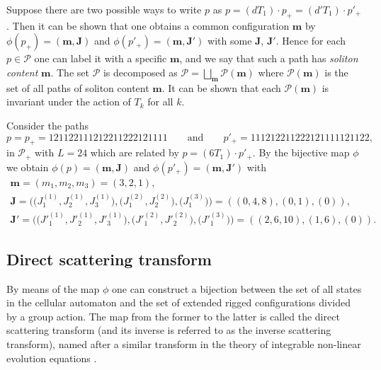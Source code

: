 \documentclass[pdftex]{sigma}
\newcommand{\Pth}{{\mathcal P}}
\newcommand{\m}{{\boldsymbol m}}
\newcommand{\boJ}{{\boldsymbol J}}
\begin{document}
Suppose there are two possible ways to write $p$ as $p =(d T_1) \cdot p_+ = (d' T_1) \cdot p'_+$.
Then it can be shown that
one obtains a common conf\/iguration $\m$ by $\phi (p_+) = (\m,\boJ)$ and $\phi (p'_+) = (\m,\boJ')$ with some $\boJ$, $\boJ'$.
Hence for each $p \in {\mathcal P}$ one can label it with a specif\/ic $\m$, and we say that such a path has {\em soliton content} $\m$.
The set ${\mathcal P}$ is decomposed as ${\mathcal P} = \bigsqcup_{\m} {\mathcal P}(\m)$
where ${\mathcal P}(\m)$ is the set of all paths of soliton content $\m$.
It can be shown that each ${\mathcal P}(\m)$ is
invariant under the action of $T_k$ for all $k$.

\begin{example}\label{ex:oct16_1}
Consider the paths
\begin{equation*}
p=p_+=121122111212211222121111 \qquad \mbox{and} \qquad p'_+=111212211222121111121122,
\end{equation*}
in $\Pth_+$ with $L=24$ which are related by
$p = (6 T_1) \cdot p'_+$.
By the bijective map $\phi$
we obtain
$\phi (p) = (\m, \boJ)$ and $\phi (p'_+) = (\m, \boJ')$
with
\begin{gather*}
\m  = (m_1, m_2, m_3) = (3,2,1),\\
\boJ  = \big(\big(J^{(1)}_1,J^{(1)}_2,J^{(1)}_3\big),\big(J^{(2)}_1,J^{(2)}_2\big),\big(J^{(3)}_1\big)\big) = ((0,4,8),(0,1),(0)),\\
\boJ'  = \big(\big(J'^{(1)}_1,J'^{(1)}_2,J'^{(1)}_3\big),\big(J'^{(2)}_1,J'^{(2)}_2\big),\big(J'^{(3)}_1\big)\big) = ((2,6,10),(1,6),(0)).
\end{gather*}
\end{example}


\subsection{Direct scattering transform}\label{subsec:4_3}

By means of the map $\phi$ one can construct a bijection between the set of
all states in the cellular automaton and the set of extended rigged conf\/igurations divided by a group action.
The map from the former to the latter is called the direct scattering transform
(and its inverse is referred to as the inverse scattering transform),
named after a similar transform in the theory of integrable non-linear evolution equations \cite{AS}.
\end{document}
